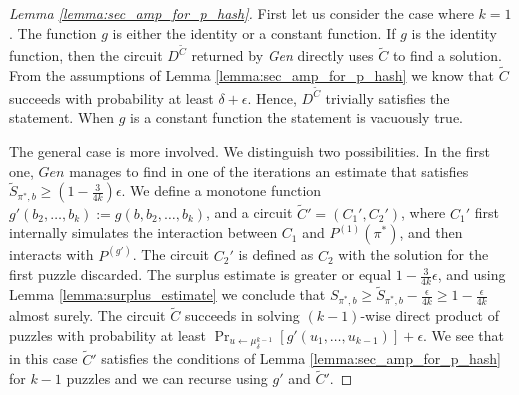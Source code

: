 \begin{proof}[Lemma \ref{lemma:sec_amp_for_p_hash}]
First let us consider the case where $k=1$. The function $g$ is either the identity or a constant function.
If $g$ is the identity function, then the circuit $D^{\widetilde{C}}$ returned by \textit{Gen} directly uses $\widetilde{C}$ to find a solution.
From the assumptions of Lemma \ref{lemma:sec_amp_for_p_hash} we know that $\widetilde{C}$ succeeds with probability at least
$\delta + \epsilon$. Hence, $D^{\widetilde{C}}$ trivially satisfies the statement.
When $g$ is a constant function the statement is vacuously true.

The general case is more involved. We distinguish two possibilities.
In the first one, $Gen$ manages to find in one of the iterations an estimate that satisfies $\widetilde{S}_{\pi^*,b} \geq (1-\frac{3}{4k})\epsilon$.
We define a monotone function $g'(b_2, \dots, b_k) := g(b, b_2, \dots, b_k)$, and a circuit $\widetilde{C}' = (C_1', C_2')$, where
$C_1'$ first internally simulates the interaction between $C_1$ and $P^{(1)}(\pi^*)$, and then interacts with $P^{(g')}$.
The circuit $C_2'$ is defined as $C_2$ with the solution for the first puzzle discarded.
The surplus estimate is greater or equal $1 - \frac{3}{4k}\epsilon$, and using Lemma \ref{lemma:surplus_estimate}
we conclude that $S_{\pi^*,b} \geq \widetilde{S}_{\pi^*, b} - \frac{\epsilon}{4k} \geq 1 - \frac{\epsilon}{4k}$ almost surely.
The circuit $\widetilde{C}$ succeeds in solving $(k-1)$-wise direct product of puzzles with probability
at least $\Pr_{u \leftarrow \mu^{k-1}_{\delta}}[g'(u_1,\dots, u_{k-1} )] + \epsilon$.
We see that in this case $\widetilde{C}'$ satisfies the conditions of Lemma \ref{lemma:sec_amp_for_p_hash}
for $k-1$ puzzles and we can recurse using $g'$ and $\widetilde{C}'$.


\end{proof}
